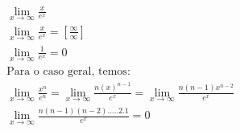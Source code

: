 \begin{ex}
\begin{align}
&\lim_{x\rightarrow \infty} \frac{x}{e^{x}}\nonumber\\
&\lim_{x\rightarrow \infty} \frac{x}{e^{x}} = \left[\frac{\infty}{\infty}\right]\nonumber\\
&\lim_{x\rightarrow \infty} \frac{1}{e^{x}}=0\nonumber\\
&\text{Para o caso geral, temos:}\nonumber\\
&\lim_{x\rightarrow \infty} \frac{x^{n}}{e^{n}}=\lim_{x\rightarrow \infty} \frac{n(x)^{n-1}}{e^{x}}=\lim_{x\rightarrow \infty} \frac{n(n-1)x^{n-2}}{e^{x}}\nonumber\\
&\lim_{x\rightarrow \infty} \frac{n(n-1)(n-2).....2.1}{e^{x}}=0\nonumber
\end{align}
\end{ex}